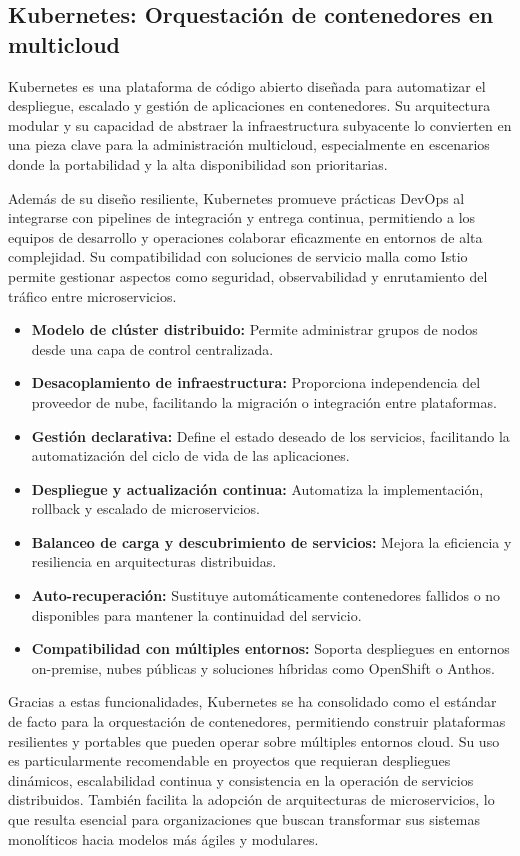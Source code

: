 {        \subsection{Kubernetes: Orquestación de contenedores en multicloud}
            Kubernetes es una plataforma de código abierto diseñada para automatizar el despliegue, escalado y gestión de aplicaciones en contenedores. Su arquitectura modular y su capacidad de abstraer la infraestructura subyacente lo convierten en una pieza clave para la administración multicloud, especialmente en escenarios donde la portabilidad y la alta disponibilidad son prioritarias.
                
            Además de su diseño resiliente, Kubernetes promueve prácticas DevOps al integrarse con pipelines de integración y entrega continua, permitiendo a los equipos de desarrollo y operaciones colaborar eficazmente en entornos de alta complejidad. Su compatibilidad con soluciones de servicio malla como Istio permite gestionar aspectos como seguridad, observabilidad y enrutamiento del tráfico entre microservicios.
                
            \begin{itemize}
                \item \textbf{Modelo de clúster distribuido:} Permite administrar grupos de nodos desde una capa de control centralizada.
                \item \textbf{Desacoplamiento de infraestructura:} Proporciona independencia del proveedor de nube, facilitando la migración o integración entre plataformas.
                \item \textbf{Gestión declarativa:} Define el estado deseado de los servicios, facilitando la automatización del ciclo de vida de las aplicaciones.
                \item \textbf{Despliegue y actualización continua:} Automatiza la implementación, rollback y escalado de microservicios.
                \item \textbf{Balanceo de carga y descubrimiento de servicios:} Mejora la eficiencia y resiliencia en arquitecturas distribuidas.
                \item \textbf{Auto-recuperación:} Sustituye automáticamente contenedores fallidos o no disponibles para mantener la continuidad del servicio.
                \item \textbf{Compatibilidad con múltiples entornos:} Soporta despliegues en entornos on-premise, nubes públicas y soluciones híbridas como OpenShift o Anthos.
            \end{itemize}
                
            Gracias a estas funcionalidades, Kubernetes se ha consolidado como el estándar de facto para la orquestación de contenedores, permitiendo construir plataformas resilientes y portables que pueden operar sobre múltiples entornos cloud. Su uso es particularmente recomendable en proyectos que requieran despliegues dinámicos, escalabilidad continua y consistencia en la operación de servicios distribuidos. También facilita la adopción de arquitecturas de microservicios, lo que resulta esencial para organizaciones que buscan transformar sus sistemas monolíticos hacia modelos más ágiles y modulares.
        
}